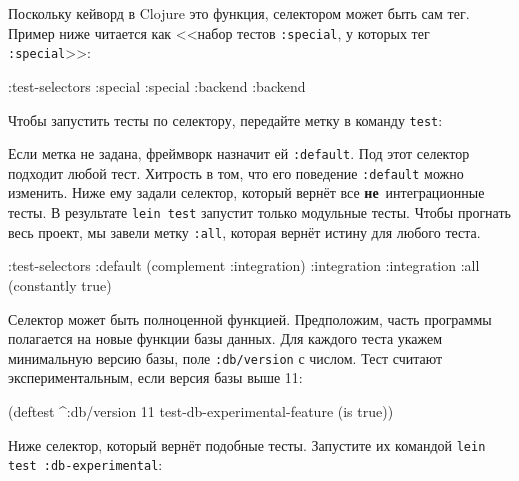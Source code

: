 Поскольку кейворд в Clojure это функция, селектором может быть сам тег. Пример
ниже читается как <<набор тестов \verb|:special|, у которых тег \verb|:special|>>:

\begin{english}
  \begin{clojure}
:test-selectors {:special :special
                 :backend :backend}
  \end{clojure}
\end{english}

\noindent
Чтобы запустить тесты по селектору, передайте метку в команду \verb|test|:

\begin{english}
\end{english}


Если метка не задана, фреймворк назначит ей \verb|:default|. Под этот селектор
подходит любой тест. Хитрость в том, что его поведение \verb|:default| можно
изменить. Ниже ему задали селектор, который вернёт все
\textbf{не}~интеграционные тесты. В результате \verb|lein test| запустит только
модульные тесты. Чтобы прогнать весь проект, мы завели метку \verb|:all|,
которая вернёт истину для любого теста.

\begin{english}
  \begin{clojure}
:test-selectors {:default (complement :integration)
                 :integration :integration
                 :all (constantly true)}
  \end{clojure}
\end{english}

Селектор может быть полноценной функцией. Предположим, часть программы
полагается на новые функции базы данных. Для каждого теста укажем минимальную
версию базы, поле \verb|:db/version| с числом. Тест считают экспериментальным,
если версия базы выше 11:

\begin{english}
  \begin{clojure}
(deftest ^{:db/version 11}
  test-db-experimental-feature
  (is true))
  \end{clojure}
\end{english}

\noindent
Ниже селектор, который вернёт подобные тесты. Запустите их командой
\verb|lein test :db-experimental|:

